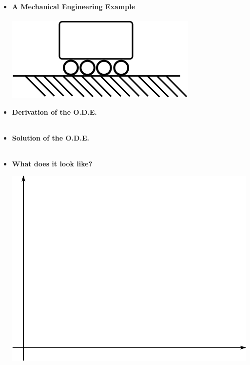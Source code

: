 \documentclass[11pt]{article}
\begin{document}
\begin{itemize}
\begin{itemize}
	\end{itemize}


\newpage

\item \textbf{\LARGE A Mechanical Engineering Example}\\\\	


		\includegraphics[scale=0.75]{lecture1_fig3.png}\\
		
		
\newpage

\item \textbf{\LARGE Derivation of the O.D.E.}\\\\	
		
\newpage

\item \textbf{\LARGE Solution of the O.D.E.}\\\\	
		
\newpage

\item \textbf{\LARGE What does it look like?}

	\includegraphics[scale=0.4]{lecture1_fig2.png}\\
	

\end{itemize}
\end{document}
